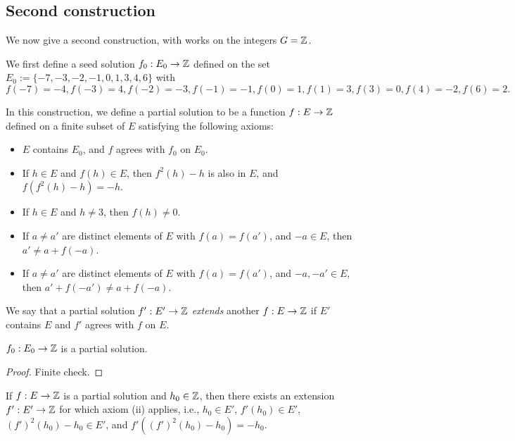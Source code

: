 \subsection{Second construction}

We now give a second construction, with works on the integers $G = \mathbb{Z}$.

We first define a seed solution $f_0: E_0 \to \mathbb{Z}$ defined on the set $E_0 := \{-7, -3, -2, -1, 0, 1, 3, 4, 6 \}$ with
$$ f(-7)=-4, f(-3) = 4, f(-2)=-3, f(-1)=-1, f(0) = 1, f(1) = 3, f(3)=0, f(4) = -2, f(6) = 2.$$

In this construction, we define a partial solution to be a function $f: E \to \mathbb{Z}$ defined on a finite subset of $E$ satisfying the following axioms:
\begin{itemize}
\item[(i)] $E$ contains $E_0$, and $f$ agrees with $f_0$ on $E_0$.
\item[(ii)] If $h \in E$ and $f(h) \in E$, then $f^2(h)-h$ is also in $E$, and $f(f^2(h)-h) = -h$.
\item[(iii)] If $h \in E$ and $h \neq 3$, then $f(h) \neq 0$.
\item[(iv)]  If $a \neq a'$ are distinct elements of $E$ with $f(a)=f(a')$, and $-a \in E$, then $a' \neq a + f(-a)$.
\item[(v)]  If $a \neq a'$ are distinct elements of $E$ with $f(a)=f(a')$, and $-a, -a' \in E$, then $a' + f(-a') \neq a + f(-a)$.
\end{itemize}
We say that a partial solution $f': E' \to \mathbb{Z}$ \emph{extends} another $f: E \to \mathbb{Z}$ if $E'$ contains $E$ and $f'$ agrees with $f$ on $E$.

\begin{lemma}\label{finite-check} $f_0: E_0 \to \mathbb{Z}$ is a partial solution.
\end{lemma}

\begin{proof} Finite check.
\end{proof}

\begin{lemma}[Extension]\label{extension-lemma}\leanok{} If $f: E \to \mathbb{Z}$ is a partial solution and $h_0 \in \mathbb{Z}$, then there exists an extension $f': E' \to \mathbb{Z}$ for which axiom (ii) applies, i.e., $h_0 \in E'$, $f'(h_0) \in E'$, $(f')^2(h_0)-h_0 \in E'$, and $f'((f')^2(h_0)-h_0) = -h_0$.
\end{lemma}

